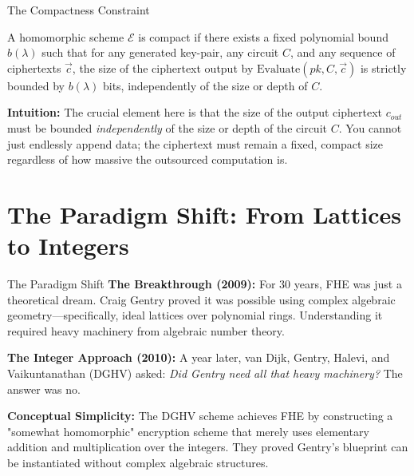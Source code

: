 \documentclass[10pt, aspectratio=169]{beamer}
\begin{document}
\begin{frame}{The Compactness Constraint}
    \begin{definition}[2.3: Compactness]
    A homomorphic scheme $\mathcal{E}$ is compact if there exists a fixed polynomial bound $b(\lambda)$ such that for any generated key-pair, any circuit $C$, and any sequence of ciphertexts $\vec{c}$, the size of the ciphertext output by $\text{Evaluate}(pk, C, \vec{c})$ is strictly bounded by $b(\lambda)$ bits, independently of the size or depth of $C$.
    \end{definition}
    \pause
    
    \vspace{0.5cm}
    \textbf{Intuition:} 
    The crucial element here is that the size of the output ciphertext $c_{out}$ must be bounded \textit{independently} of the size or depth of the circuit $C$. You cannot just endlessly append data; the ciphertext must remain a fixed, compact size regardless of how massive the outsourced computation is.
\end{frame}

\section{The Paradigm Shift: From Lattices to Integers}
\begin{frame}{The Paradigm Shift}
    \textbf{The Breakthrough (2009):}
    For 30 years, FHE was just a theoretical dream. Craig Gentry proved it was possible using complex algebraic geometry—specifically, ideal lattices over polynomial rings. Understanding it required heavy machinery from algebraic number theory.
    \pause
    
    \vspace{0.3cm}
    \textbf{The Integer Approach (2010):}
    A year later, van Dijk, Gentry, Halevi, and Vaikuntanathan (DGHV) asked: \textit{Did Gentry need all that heavy machinery?} The answer was no.
    \pause
    
    \vspace{0.3cm}
    \textbf{Conceptual Simplicity:}
    The DGHV scheme achieves FHE by constructing a "somewhat homomorphic" encryption scheme that merely uses elementary addition and multiplication over the integers. They proved Gentry's blueprint can be instantiated without complex algebraic structures.
\end{frame}
\end{document}
